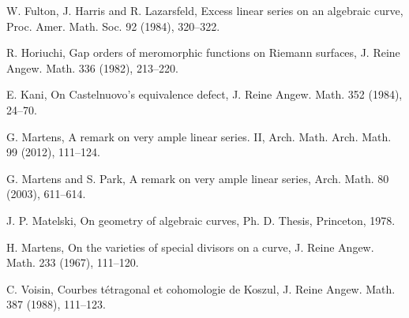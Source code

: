 \documentclass{amsart}
\theoremstyle{plain}
\theoremstyle{definition}
\begin{document}
\begin{thebibliography}{99}
 W. Fulton, J. Harris and R. Lazarsfeld, Excess linear series on an algebraic curve, Proc. Amer. Math. Soc. 92 (1984), 320--322.

 R. Horiuchi, Gap orders of meromorphic functions on Riemann surfaces, J. Reine Angew. Math. 336 (1982), 213--220.

 E. Kani, On Castelnuovo's equivalence defect, J. Reine Angew. Math. 352 (1984), 24--70.


 G. Martens, A remark on very ample linear series. II, Arch. Math. Arch. Math. 99 (2012), 111--124.

 G. Martens and S. Park, A remark on very ample linear series, Arch. Math. 80 (2003),
611--614.

 J. P. Matelski, On geometry of algebraic curves, Ph. D. Thesis, Princeton, 1978.


 H. Martens, On the varieties of special divisors on a curve, J. Reine Angew. Math. 233 (1967),
111--120.

 C. Voisin, Courbes t\'{e}tragonal et cohomologie de Koszul, J. Reine Angew. Math. 387 (1988), 111--123.

\end{thebibliography}
\end{document}
